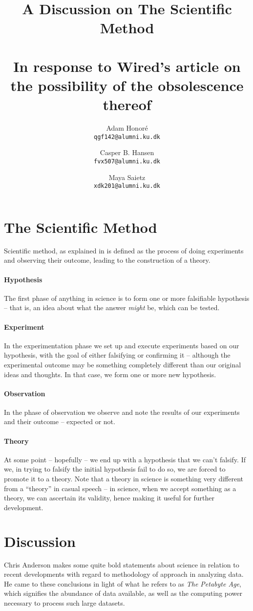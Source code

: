 \documentclass[11pt,a4paper]{article}
\title{A Discussion on The Scientific Method
       \\\hfill\\
       \large{In response to Wired’s article on the possibility of the obsolescence thereof}}
\author
{
	Adam Honoré\\
	{\tt qgf142@alumni.ku.dk}
	\and
	Casper B. Hansen\\
	{\tt fvx507@alumni.ku.dk}
	\and
	Maya Saietz\\
	{\tt xdk201@alumni.ku.dk}
}
\begin{document}
\maketitle

\section{The Scientific Method}
Scientific method, as explained in\cite{okasha02} is defined as the process of doing experiments and observing their outcome, leading to the construction of a theory.

\paragraph{Hypothesis}
The first phase of anything in science is to form one or more falsifiable hypothesis -- that is, an idea about what the answer \emph{might} be, which can be tested.

\paragraph{Experiment}
In the experimentation phase we set up and execute experiments based on our hypothesis, with the goal of either falsifying or confirming it -- although the experimental outcome may be something completely different than our original ideas and thoughts. In that case, we form one or more new hypothesis.

\paragraph{Observation}
In the phase of observation we observe and note the results of our experiments and their outcome -- expected or not.

\paragraph{Theory}
At some point -- hopefully -- we end up with a hypothesis that we can’t falsify. If we, in trying to falsify the initial hypothesis fail to do so, we are forced to promote it to a theory. Note that a theory in science is something very different from a ``theory'' in casual speech -- in science, when we accept something as a theory, we can ascertain its validity, hence making it useful for further development.

\section{Discussion}
Chris Anderson makes some quite bold statements about science in relation to recent developments with regard to methodology of approach in analyzing data. He came to these conclusions in light of what he refers to as \emph{The Petabyte Age}, which signifies the abundance of data available, as well as the computing power necessary to process such large datasets.
\end{document}
